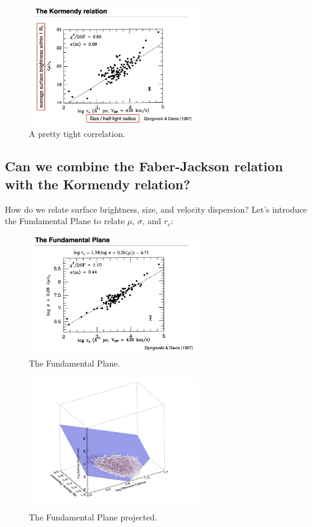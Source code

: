 \documentclass{article}
\begin{document}
\begin{figure}
    \centering
\includegraphics[width=0.66\textwidth]{figs/Screen Shot 2021-10-15 at 10.31.51 AM.png}
    \caption{A pretty tight correlation.}
    \label{fig:kormendy_re}
\end{figure}

\subsection{Can we combine the Faber-Jackson relation with the Kormendy relation?}

How do we relate surface brightness, size, and velocity dispersion? Let's introduce the Fundamental Plane to relate $\mu$, $\sigma$, and $r_e$:

\begin{figure}
    \centering
\includegraphics[width=0.66\textwidth]{figs/Screen Shot 2021-10-15 at 10.33.08 AM.png}
    \caption{The Fundamental Plane.}
    \label{fig:fundamental_plane2}
\end{figure}

\begin{figure}
    \centering
\includegraphics[width=0.66\textwidth]{figs/Screen Shot 2021-10-15 at 10.34.56 AM.png}
    \caption{The Fundamental Plane projected.}
    \label{fig:fundamental_plane_3d}
\end{figure}
\end{document}
